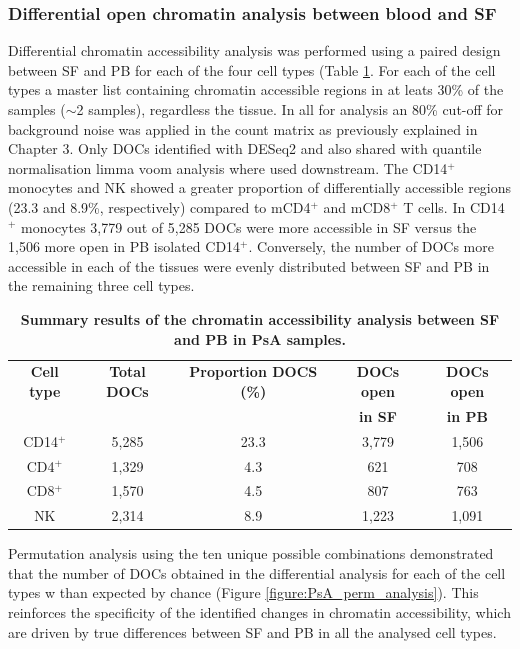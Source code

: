 \subsubsection{Differential open chromatin analysis between blood and SF}
Differential chromatin accessibility analysis was performed using a paired design between SF and PB for each of the four cell types (Table \ref{tab:PSA_DOCs_results}. For each of the cell types a master list containing chromatin accessible regions in at leats 30\% of the samples ($\sim$2 samples), regardless the tissue. In all for analysis an 80\% cut-off for background noise was applied in the count matrix as previously explained in Chapter 3. Only DOCs identified with DESeq2 and also shared with quantile normalisation limma voom analysis where used downstream. The CD14$^+$ monocytes and NK showed a greater proportion of differentially accessible regions (23.3 and 8.9\%, respectively) compared to mCD4$^+$ and mCD8$^+$ T cells. In CD14$^+$ monocytes 3,779 out of 5,285 DOCs were more accessible in SF versus the 1,506 more open in PB isolated CD14$^+$. Conversely, the number of DOCs more accessible in each of the tissues were evenly distributed between SF and PB in the remaining three cell types.


\begin{table}[htbp]
\centering
\begin{tabular}{@{} c c c c c}
\toprule
\textbf{Cell type} & \textbf{Total DOCs} &  \textbf{Proportion DOCS (\%)} &\textbf{DOCs open} & \textbf{DOCs open } \\
                   &                     &                                &\textbf{in SF}     & \textbf{in PB} \\
\midrule
\midrule
CD14$^+$ & 5,285 & 23.3 & 3,779 & 1,506\\
CD4$^+$ & 1,329 & 4.3 & 621 & 708\\
CD8$^+$ & 1,570 & 4.5 & 807 & 763\\
NK      & 2,314 & 8.9 & 1,223 & 1,091\\
\bottomrule
\end{tabular}
\medskip %
\caption[Summary results of the chromatin accessibility analysis between SF and PB in PsA samples]{\textbf{Summary results of the chromatin accessibility analysis between SF and PB in PsA samples.}}
\label{tab:PSA_DOCs_results}
\end{table}

Permutation analysis using the ten unique possible combinations demonstrated that the number of DOCs obtained in the differential analysis for each of the cell types w than expected by chance (Figure \ref{figure:PsA_perm_analysis}). This reinforces the specificity of the identified changes in chromatin accessibility, which are driven by true differences between SF and PB in all the analysed cell types.

